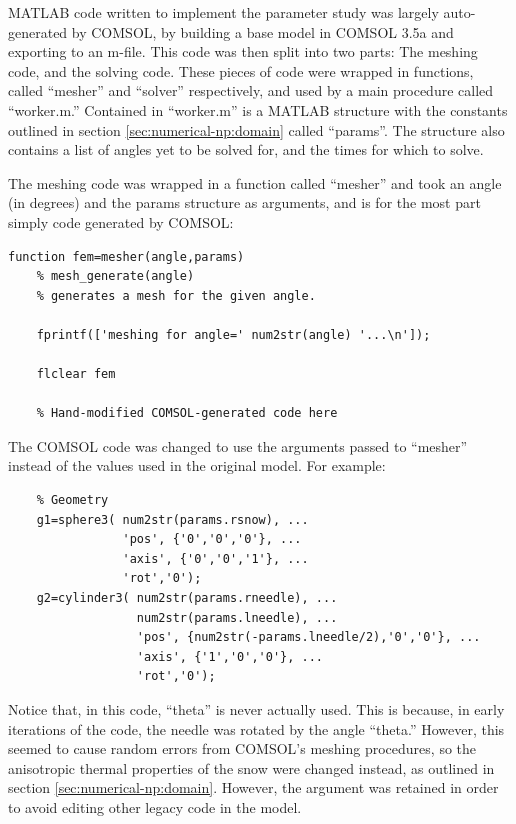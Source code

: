 MATLAB code written to implement the parameter study was largely auto-generated
by COMSOL, by building a base model in COMSOL 3.5a and exporting to an m-file.
This code was then split into two parts: The meshing code, and the solving code.
These pieces of code were wrapped in functions, called ``mesher'' and ``solver''
respectively, and used by a main procedure called ``worker.m.'' Contained in
``worker.m'' is a MATLAB structure with the constants outlined in section
\ref{sec:numerical-np:domain} called ``params''. The structure also contains a
list of angles yet to be solved for, and the times for which to solve.

The meshing code was wrapped in a function called ``mesher'' and took an angle
(in degrees) and the params structure as arguments, and is for the most part
simply code generated by COMSOL:

\small
\begin{verbatim}
function fem=mesher(angle,params)
    % mesh_generate(angle)
    % generates a mesh for the given angle. 

    fprintf(['meshing for angle=' num2str(angle) '...\n']);

    flclear fem

    % Hand-modified COMSOL-generated code here
\end{verbatim}
\normalsize

The COMSOL code was changed to use the arguments passed to ``mesher'' instead of
the values used in the original model. For example:

\small
\begin{verbatim}
    % Geometry
    g1=sphere3( num2str(params.rsnow), ...
                'pos', {'0','0','0'}, ...
                'axis', {'0','0','1'}, ...
                'rot','0');
    g2=cylinder3( num2str(params.rneedle), ...
                  num2str(params.lneedle), ...
                  'pos', {num2str(-params.lneedle/2),'0','0'}, ...
                  'axis', {'1','0','0'}, ...
                  'rot','0');
\end{verbatim}
\normalsize

Notice that, in this code, ``theta'' is never actually used. This is
because, in early iterations of the code, the needle was rotated by the angle
``theta.'' However, this seemed to cause random errors from COMSOL's meshing
procedures, so the anisotropic thermal properties of the snow were changed
instead, as outlined in section \ref{sec:numerical-np:domain}. However, the
argument was retained in order to avoid editing other legacy code in the model.

